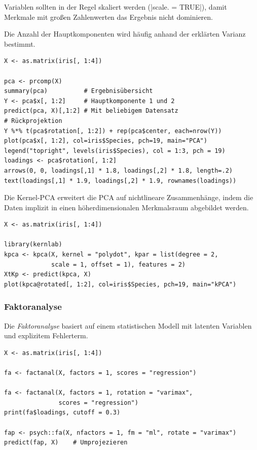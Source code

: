 \documentclass[10pt,twocolumn]{scrartcl}
\renewcommand{\lstinline}{\mycoloredinline}
\begin{document}
Variablen sollten in der Regel skaliert werden (\lstinline|scale. = TRUE|), damit Merkmale mit großen Zahlenwerten das Ergebnis nicht dominieren.

Die Anzahl der Hauptkomponenten wird häufig anhand der erklärten Varianz bestimmt.

\begin{lstlisting}
X <- as.matrix(iris[, 1:4])

pca <- prcomp(X)
summary(pca)          # Ergebnisübersicht
Y <- pca$x[, 1:2]     # Hauptkomponente 1 und 2
predict(pca, X)[,1:2] # Mit beliebigem Datensatz
# Rückprojektion
Y %*% t(pca$rotation[, 1:2]) + rep(pca$center, each=nrow(Y))
plot(pca$x[, 1:2], col=iris$Species, pch=19, main="PCA")
legend("topright", levels(iris$Species), col = 1:3, pch = 19)
loadings <- pca$rotation[, 1:2]
arrows(0, 0, loadings[,1] * 1.8, loadings[,2] * 1.8, length=.2)
text(loadings[,1] * 1.9, loadings[,2] * 1.9, rownames(loadings))
\end{lstlisting}

Die Kernel-PCA erweitert die PCA auf nichtlineare Zusammenhänge, indem die Daten
implizit in einen höherdimensionalen Merkmalsraum abgebildet werden.

\begin{lstlisting}
X <- as.matrix(iris[, 1:4])

library(kernlab)
kpca <- kpca(X, kernel = "polydot", kpar = list(degree = 2,
             scale = 1, offset = 1), features = 2)
XtKp <- predict(kpca, X)
plot(kpca@rotated[, 1:2], col=iris$Species, pch=19, main="kPCA")
\end{lstlisting}

\subsubsection{Faktoranalyse}

Die \emph{Faktoranalyse} basiert auf einem statistischen Modell mit latenten Variablen und explizitem Fehlerterm.

\begin{lstlisting}
X <- as.matrix(iris[, 1:4])

fa <- factanal(X, factors = 1, scores = "regression")

fa <- factanal(X, factors = 1, rotation = "varimax",
               scores = "regression")
print(fa$loadings, cutoff = 0.3)

fap <- psych::fa(X, nfactors = 1, fm = "ml", rotate = "varimax")
predict(fap, X)    # Umprojezieren
\end{lstlisting}
\end{document}
